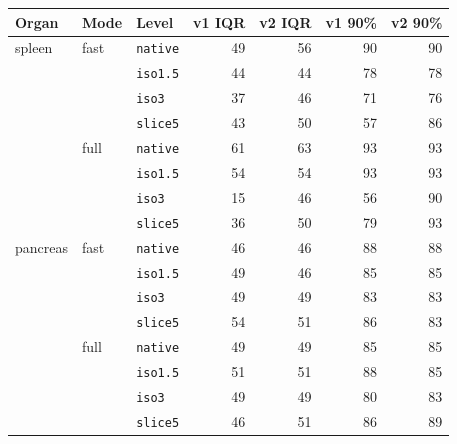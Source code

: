 \begin{tabular}{lllrrrr}
\toprule
Organ & Mode & Level & v1 IQR & v2 IQR & v1 90\% & v2 90\% \\
\midrule
spleen & fast & \texttt{native} & 49 & 56 & 90 & 90 \\
 &  & \texttt{iso1.5} & 44 & 44 & 78 & 78 \\
 &  & \texttt{iso3} & 37 & 46 & 71 & 76 \\
 &  & \texttt{slice5} & 43 & 50 & 57 & 86 \\
 & full & \texttt{native} & 61 & 63 & 93 & 93 \\
 &  & \texttt{iso1.5} & 54 & 54 & 93 & 93 \\
 &  & \texttt{iso3} & 15 & 46 & 56 & 90 \\
 &  & \texttt{slice5} & 36 & 50 & 79 & 93 \\
\midrule
pancreas & fast & \texttt{native} & 46 & 46 & 88 & 88 \\
 &  & \texttt{iso1.5} & 49 & 46 & 85 & 85 \\
 &  & \texttt{iso3} & 49 & 49 & 83 & 83 \\
 &  & \texttt{slice5} & 54 & 51 & 86 & 83 \\
 & full & \texttt{native} & 49 & 49 & 85 & 85 \\
 &  & \texttt{iso1.5} & 51 & 51 & 88 & 85 \\
 &  & \texttt{iso3} & 49 & 49 & 80 & 83 \\
 &  & \texttt{slice5} & 46 & 51 & 86 & 89 \\
\bottomrule
\end{tabular}

